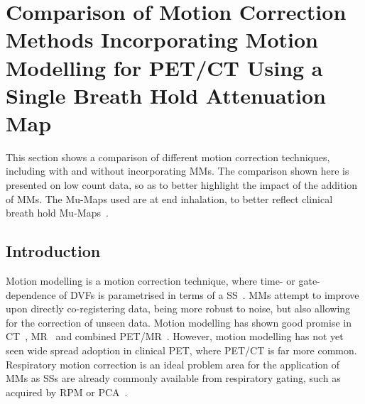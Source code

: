     \section{Comparison of Motion Correction Methods Incorporating Motion Modelling for PET/CT Using a Single Breath Hold Attenuation Map} \label{sec:comparison_of_motion_correction_methods_incorporating_motion_modelling_for_pet_ct_using_a_single_breath_hold_attenuation_map}
        This section shows a comparison of different motion correction techniques, including with and without incorporating \glspl{MM}. The comparison shown here is presented on low count data, so as to better highlight the impact of the addition of \glspl{MM}. The \glspl{Mu-Map} used are at end inhalation, to better reflect clinical breath hold \glspl{Mu-Map}~\parencite{Whitehead2021ComparisonMap}.
        
        \subsection{Introduction} \label{sec:comparison_of_motion_correction_methods_incorporating_motion_modelling_for_pet_ct_using_a_single_breath_hold_attenuation_map_introduction}
            Motion modelling is a motion correction technique, where time- or gate-dependence of \glspl{DVF} is parametrised in terms of a \gls{SS}~\parencite{McClelland2013}. \glspl{MM} attempt to improve upon directly co-registering data, being more robust to noise, but also allowing for the correction of unseen data. Motion modelling has shown good promise in \gls{CT}~\parencite{Li2007EnhancedModel}, \gls{MR}~\parencite{Manke2002RespiratoryModels} and combined \gls{PET}/\gls{MR}~\parencite{Manber2016JointCorrection}. However, motion modelling has not yet seen wide spread adoption in clinical \gls{PET}, where \gls{PET}/\gls{CT} is far more common. Respiratory motion correction is an ideal problem area for the application of \glspl{MM} as \glspl{SS} are already commonly available from respiratory gating, such as acquired by \gls{RPM} or \gls{PCA}~\parencite{Thielemans2011}.
            
